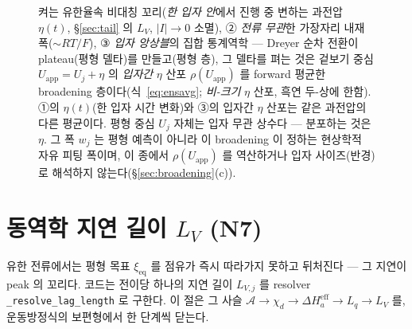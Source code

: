 \documentclass[11pt,a4paper]{article}
\newcommand{\eff}{\mathrm{eff}}
\newcommand{\eq}{\mathrm{eq}}
\newcommand{\app}{\mathrm{app}}
\newcommand{\code}[1]{\texttt{#1}}
\begin{document}
\begin{figure}[t]
{{켜는} 유한율속 비대칭 꼬리(\emph{한 입자 안}에서 진행 중 변하는 과전압 $\eta(t)$, \S\ref{sec:tail} 의 $L_V$,
$|I|\!\to\!0$ 소멸), ② \emph{전류 무관}한 가장자리 내재 폭($\sim RT/F$), ③ \emph{입자 앙상블}의 집합 통계역학 —
Dreyer 순차 전환이 plateau(평형 델타)를 만들고(평형 층), 그 델타를 펴는 것은 겉보기 중심 $U_\app=U_j+\eta$ 의
\emph{입자간} $\eta$ 산포 $\rho(U_\app)$ 를 forward 평균한 broadening 층이다(식~\eqref{eq:ensavg}; \emph{비-크기} $\eta$
산포, 흑연 두-상에 한함). ①의 $\eta(t)$(한 입자 시간 변화)와 ③의 입자간 $\eta$ 산포는 같은 과전압의 다른 평균이다.
평형 중심 $U_j$ 자체는 입자 무관 상수다 — 분포하는 것은 $\eta$. 그 폭 $w_j$ 는 평형 예측이 아니라 이 broadening 이
정하는 현상학적 자유 피팅 폭이며, 이 종에서 $\rho(U_\app)$ 를 역산하거나 입자 사이즈(반경)로 해석하지 않는다(\S\ref{sec:broadening}(c)).}
\label{fig:broadening}
\end{figure}

\section{동역학 지연 길이 $L_V$ (N7)}\label{sec:lag}
유한 전류에서는 평형 목표 $\xi_\eq$ 를 점유가 즉시 따라가지 못하고 뒤처진다 — 그 지연이 peak 의 꼬리다. 코드는 전이당
하나의 지연 길이 $L_{V,j}$ 를 resolver \code{\_resolve\_lag\_length} 로 구한다. 이 절은 그 사슬
$\mathcal A\to\chi_d\to\Delta H_a^\eff\to L_q\to L_V$ 를, 운동방정식의 보편형에서 한 단계씩 닫는다.
\end{document}
